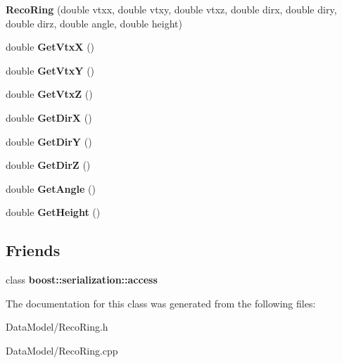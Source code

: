 \begin{DoxyCompactItemize}
\item 
\hypertarget{classRecoRing_aad9148ea7aaaca9b6f4509a8dd8e75f8}{
{\bfseries RecoRing} (double vtxx, double vtxy, double vtxz, double dirx, double diry, double dirz, double angle, double height)}
\label{classRecoRing_aad9148ea7aaaca9b6f4509a8dd8e75f8}

\item 
\hypertarget{classRecoRing_a8b0e0f398d68a61999efacf0662af29a}{
double {\bfseries GetVtxX} ()}
\label{classRecoRing_a8b0e0f398d68a61999efacf0662af29a}

\item 
\hypertarget{classRecoRing_a95779c64bb634cd25f509f31f2db7430}{
double {\bfseries GetVtxY} ()}
\label{classRecoRing_a95779c64bb634cd25f509f31f2db7430}

\item 
\hypertarget{classRecoRing_aa7aab08808cf6477def588a4cc4cfcb4}{
double {\bfseries GetVtxZ} ()}
\label{classRecoRing_aa7aab08808cf6477def588a4cc4cfcb4}

\item 
\hypertarget{classRecoRing_a1056b0bc240d4dfd2babdf634dd0320d}{
double {\bfseries GetDirX} ()}
\label{classRecoRing_a1056b0bc240d4dfd2babdf634dd0320d}

\item 
\hypertarget{classRecoRing_aa7604833daff752d38c6d8751522c257}{
double {\bfseries GetDirY} ()}
\label{classRecoRing_aa7604833daff752d38c6d8751522c257}

\item 
\hypertarget{classRecoRing_afed3c82a79e94a6ffdbb44702c00a230}{
double {\bfseries GetDirZ} ()}
\label{classRecoRing_afed3c82a79e94a6ffdbb44702c00a230}

\item 
\hypertarget{classRecoRing_a297982bcc3c73a3e18a06118be109747}{
double {\bfseries GetAngle} ()}
\label{classRecoRing_a297982bcc3c73a3e18a06118be109747}

\item 
\hypertarget{classRecoRing_a8f85725e258ca053ca6916946fb35765}{
double {\bfseries GetHeight} ()}
\label{classRecoRing_a8f85725e258ca053ca6916946fb35765}

\end{DoxyCompactItemize}
\subsection*{Friends}
\begin{DoxyCompactItemize}
\item 
\hypertarget{classRecoRing_ac98d07dd8f7b70e16ccb9a01abf56b9c}{
class {\bfseries boost::serialization::access}}
\label{classRecoRing_ac98d07dd8f7b70e16ccb9a01abf56b9c}

\end{DoxyCompactItemize}


The documentation for this class was generated from the following files:\begin{DoxyCompactItemize}
\item 
DataModel/RecoRing.h\item 
DataModel/RecoRing.cpp\end{DoxyCompactItemize}
